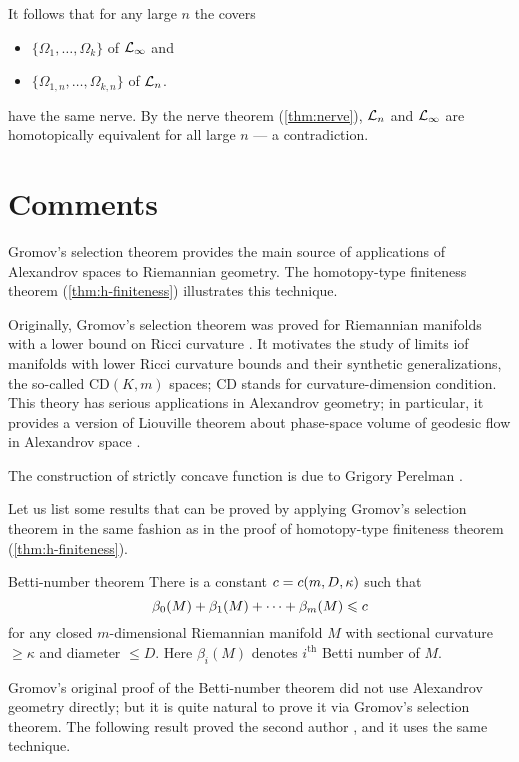 It follows that for any large $n$ the covers 
\begin{itemize}
\item $\{\Omega_{1},\dots,\Omega_{k}\}$ of $\mathcal{L}_\infty$ and 
\item $\{\Omega_{1,n},\dots,\Omega_{k,n}\}$ of $\mathcal{L}_n$.
\end{itemize}
have the same nerve.
By the nerve theorem (\ref{thm:nerve}), $\mathcal{L}_n$ and $\mathcal{L}_\infty$ are homotopically equivalent for all large $n$ --- a contradiction.
\qeds

\section{Comments}

Gromov's selection theorem provides the main source of applications of Alexandrov spaces to Riemannian geometry.
The homotopy-type finiteness theorem (\ref{thm:h-finiteness})  illustrates this technique.

Originally, Gromov's selection theorem was proved for Riemannian manifolds with a lower bound on Ricci curvature \cite{gromov1981}.
It motivates the study of limits iof manifolds with lower Ricci curvature bounds and their synthetic generalizations, the so-called $\mathrm{CD}(K,m)$ spaces; $\mathrm{CD}$ stands for curvature-dimension condition.
This theory has serious applications in Alexandrov geometry;
in particular, it provides a version of Liouville theorem about phase-space volume of geodesic flow in Alexandrov space \cite{brue-mondino-semola}.

The construction of strictly concave function is due to Grigory Perelman \cite{perelman1993,perelman-petrunin}.

Let us list some results that can be proved by applying Gromov's selection theorem
in the same fashion as in the proof of homotopy-type finiteness theorem (\ref{thm:h-finiteness}).

\begin{thm}{Betti-number theorem}
There is a constant $c=c(m,D,\kappa)$ such that 
\[\beta_0(M)+\beta_1(M)+\dots+\beta_m(M)\leqslant c\]
for any closed $m$-dimensional Riemannian manifold $M$ with sectional curvature $\ge \kappa$ and diameter $\le D$.
Here $\beta_i(M)$ denotes $i^\text{th}$ Betti number of $M$.
\end{thm}

Gromov's original proof \cite{gromov-1981} of the Betti-number theorem did not use Alexandrov geometry directly;
but it is quite natural to prove it via Gromov's selection theorem.
The following result proved the second author \cite{petrunin2008}, and it uses the same technique.

